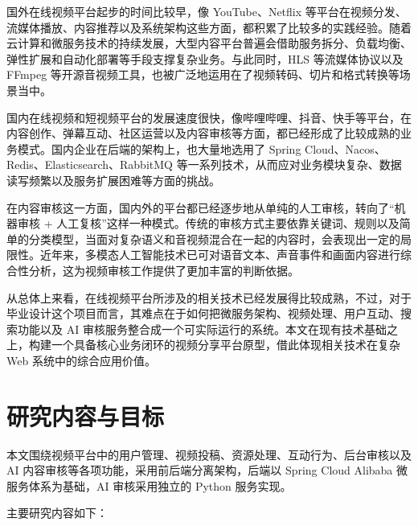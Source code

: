 国外在线视频平台起步的时间比较早，像 YouTube、Netflix 等平台在视频分发、流媒体播放、内容推荐以及系统架构这些方面，都积累了比较多的实践经验。随着云计算和微服务技术的持续发展，大型内容平台普遍会借助服务拆分、负载均衡、弹性扩展和自动化部署等手段支撑复杂业务。与此同时，HLS 等流媒体协议以及 FFmpeg 等开源音视频工具，也被广泛地运用在了视频转码、切片和格式转换等场景当中\cite{ffmpegdocs,rfc8216hls}。

国内在线视频和短视频平台的发展速度很快，像哔哩哔哩、抖音、快手等平台，在内容创作、弹幕互动、社区运营以及内容审核等方面，都已经形成了比较成熟的业务模式。国内企业在后端的架构上，也大量地选用了 Spring Cloud、Nacos、Redis、Elasticsearch、RabbitMQ 等一系列技术，从而应对业务模块复杂、数据读写频繁以及服务扩展困难等方面的挑战\cite{springclouddocs,nacosdocs,redisdocs,elasticsearchdocs,rabbitmqdocs}。

在内容审核这一方面，国内外的平台都已经逐步地从单纯的人工审核，转向了“机器审核 + 人工复核”这样一种模式。传统的审核方式主要依靠关键词、规则以及简单的分类模型，当面对复杂语义和音视频混合在一起的内容时，会表现出一定的局限性。近年来，多模态人工智能技术已可对语音文本、声音事件和画面内容进行综合性分析，这为视频审核工作提供了更加丰富的判断依据\cite{radford2023whisper,tensorflow2024yamnet,bai2023qwen}。

从总体上来看，在线视频平台所涉及的相关技术已经发展得比较成熟，不过，对于毕业设计这个项目而言，其难点在于如何把微服务架构、视频处理、用户互动、搜索功能以及 AI 审核服务整合成一个可实际运行的系统。本文在现有技术基础之上，构建一个具备核心业务闭环的视频分享平台原型，借此体现相关技术在复杂 Web 系统中的综合应用价值。

\section{研究内容与目标}
\label{sec:research-content-goal}

本文围绕视频平台中的用户管理、视频投稿、资源处理、互动行为、后台审核以及 AI 内容审核等各项功能，采用前后端分离架构，后端以 Spring Cloud Alibaba 微服务体系为基础，AI 审核采用独立的 Python 服务实现。

主要研究内容如下：

